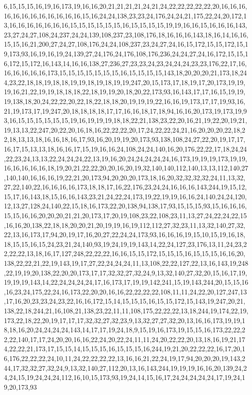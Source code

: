 6,15,15,15,16,19,16,173,19,16,16,20,21,21,21,21,24,21,24,22,22,22,22,22,20,16,16,16,16,16,16,16,16,16,16,16,16,15,16,24,24,138,23,23,24,176,24,24,21,175,22,24,20,172,13,16,16,16,16,16,16,16,15,15,15,15,15,15,16,15,15,15,15,19,19,16,16,15,16,16,16,143,23,27,24,27,108,24,237,24,24,139,108,237,23,108,176,18,16,16,16,143,18,16,14,16,16,15,15,16,21,200,27,24,27,108,176,24,24,108,237,23,24,27,24,16,15,172,15,15,172,15,19,173,93,16,19,16,19,24,139,27,24,176,24,176,108,176,236,24,24,27,24,16,172,15,15,16,172,15,172,16,143,14,16,16,138,27,236,27,23,23,24,23,24,24,24,23,23,176,22,17,16,16,16,16,16,16,173,15,15,15,15,15,15,15,16,15,15,15,15,143,18,20,20,20,21,173,18,244,23,22,18,18,19,18,18,19,19,18,19,18,19,19,247,20,15,173,17,18,19,17,20,173,19,19,19,16,21,22,19,19,18,18,18,22,18,19,19,20,18,20,22,173,93,16,143,17,17,16,15,19,19,19,138,18,20,24,22,22,20,22,18,22,18,18,20,19,19,19,22,16,16,19,173,17,17,19,93,16,21,19,173,17,19,247,20,18,18,18,18,17,17,16,16,18,17,18,94,16,16,20,173,19,173,19,93,16,15,15,15,15,15,15,19,16,19,19,19,18,18,22,21,138,23,22,20,16,21,19,22,20,19,21,19,13,13,22,247,20,22,20,16,18,16,22,22,22,20,17,24,22,22,24,21,16,20,20,20,22,18,22,18,13,13,18,16,16,18,16,17,93,16,20,19,19,20,173,93,138,108,24,27,22,20,19,17,17,16,17,15,13,13,18,16,16,17,15,19,16,16,24,108,24,24,140,16,20,176,22,22,17,18,24,24,22,23,24,13,13,22,24,24,24,22,13,19,16,20,24,24,24,24,24,16,173,19,19,19,173,19,19,16,16,16,16,16,18,19,20,21,22,22,20,20,16,20,19,32,140,140,112,140,13,13,112,140,27,140,140,16,16,16,19,22,21,20,173,94,20,20,20,173,18,16,20,32,32,32,32,24,11,13,32,27,22,140,22,16,16,16,16,173,18,18,17,16,22,176,23,24,24,16,16,16,143,244,19,15,12,15,17,16,143,18,15,16,16,143,23,21,24,22,24,173,19,22,19,19,16,16,24,140,24,24,120,12,13,27,128,24,140,22,15,18,16,173,22,20,138,94,138,17,93,15,15,15,93,15,16,16,16,15,15,16,16,20,20,20,21,21,20,173,17,20,19,108,23,22,108,23,11,13,27,24,22,24,22,15,16,16,20,138,22,18,18,20,20,21,20,19,19,16,19,112,112,27,32,23,11,13,32,140,27,32,22,13,16,173,17,94,20,19,17,16,20,27,22,24,24,173,93,16,16,16,19,15,10,15,19,16,18,18,15,15,16,15,24,23,21,24,140,93,19,24,19,19,143,14,22,24,127,23,176,13,11,24,23,22,22,22,13,18,16,17,127,248,22,22,22,16,16,15,15,172,15,15,15,16,15,15,15,16,16,20,138,22,22,21,22,19,143,19,17,27,22,24,24,24,11,13,108,22,22,127,22,13,16,143,19,248,22,19,19,20,138,22,20,20,173,17,17,32,32,27,32,24,9,13,32,140,27,32,20,15,16,17,19,19,19,19,143,14,22,24,24,24,24,17,16,173,17,19,19,142,241,15,19,143,244,20,15,15,16,16,23,24,175,22,24,16,173,22,20,20,16,16,22,22,22,22,108,11,11,24,22,20,127,247,13,17,16,20,23,23,24,23,22,16,16,172,15,14,15,15,15,16,15,15,172,15,143,19,247,20,21,138,22,18,244,21,16,108,21,138,23,22,11,11,108,175,22,22,22,13,18,244,19,174,22,19,173,22,18,22,20,19,17,17,17,32,32,27,32,23,9,13,32,27,27,32,20,13,16,16,173,19,19,18,18,16,20,24,24,24,24,143,14,17,17,19,24,18,9,15,19,16,173,19,15,15,16,173,22,22,22,22,140,17,17,24,20,20,16,16,22,24,20,22,24,11,11,24,20,22,22,20,13,18,16,19,21,174,22,22,21,173,17,15,15,14,15,15,15,16,15,15,15,16,244,19,21,20,22,22,22,16,17,20,16,176,22,22,22,24,10,11,24,22,22,22,22,13,16,16,21,22,24,19,17,94,20,20,20,19,143,244,17,32,32,27,32,24,9,13,32,140,27,112,20,13,16,143,244,19,19,19,16,16,20,139,24,24,24,15,19,24,24,24,112,16,10,15,173,93,19,24,14,15,16,17,24,24,24,24,24,17,19,24,19,20,173,93
